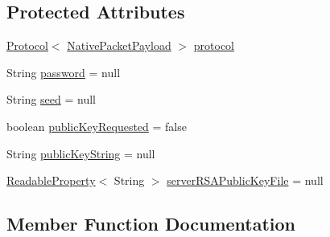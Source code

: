 \subsection*{Protected Attributes}
\begin{DoxyCompactItemize}
\item 
\mbox{\hyperlink{interfacecom_1_1mysql_1_1cj_1_1protocol_1_1_protocol}{Protocol}}$<$ \mbox{\hyperlink{classcom_1_1mysql_1_1cj_1_1protocol_1_1a_1_1_native_packet_payload}{Native\+Packet\+Payload}} $>$ \mbox{\hyperlink{classcom_1_1mysql_1_1cj_1_1protocol_1_1a_1_1authentication_1_1_sha256_password_plugin_a788d95f2169deb83be850c7c1ab0383f}{protocol}}
\item 
String \mbox{\hyperlink{classcom_1_1mysql_1_1cj_1_1protocol_1_1a_1_1authentication_1_1_sha256_password_plugin_acbf905ea39c085af53850aace57037c2}{password}} = null
\item 
String \mbox{\hyperlink{classcom_1_1mysql_1_1cj_1_1protocol_1_1a_1_1authentication_1_1_sha256_password_plugin_a73e302bdc461240e65dae1b1d38dbdcb}{seed}} = null
\item 
boolean \mbox{\hyperlink{classcom_1_1mysql_1_1cj_1_1protocol_1_1a_1_1authentication_1_1_sha256_password_plugin_ad9e4f77ff096915ff5a699ab6fe0f158}{public\+Key\+Requested}} = false
\item 
String \mbox{\hyperlink{classcom_1_1mysql_1_1cj_1_1protocol_1_1a_1_1authentication_1_1_sha256_password_plugin_abd2b41ccd4c542772bad79e01eed42d4}{public\+Key\+String}} = null
\item 
\mbox{\hyperlink{interfacecom_1_1mysql_1_1cj_1_1conf_1_1_readable_property}{Readable\+Property}}$<$ String $>$ \mbox{\hyperlink{classcom_1_1mysql_1_1cj_1_1protocol_1_1a_1_1authentication_1_1_sha256_password_plugin_a92e261c22950df4f295dbcc08ff05253}{server\+R\+S\+A\+Public\+Key\+File}} = null
\end{DoxyCompactItemize}


\subsection{Member Function Documentation}
\mbox{\label{classcom_1_1mysql_1_1cj_1_1protocol_1_1a_1_1authentication_1_1_sha256_password_plugin_a4755bae2cd1dda2546c6a338a192e7ca}} 
